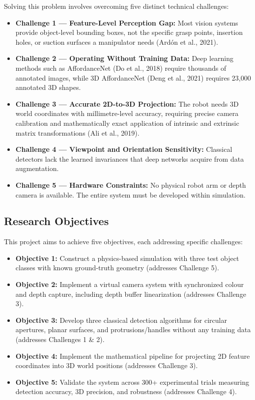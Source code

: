 \documentclass[11pt,a4paper]{article}
\begin{document}
Solving this problem involves overcoming five distinct technical challenges:

\begin{itemize}[leftmargin=1.2cm]
  \item \textbf{Challenge 1 --- Feature-Level Perception Gap:} Most vision systems provide object-level bounding boxes, not the specific grasp points, insertion holes, or suction surfaces a manipulator needs (Ard\'{o}n et al., 2021).
  \item \textbf{Challenge 2 --- Operating Without Training Data:} Deep learning methods such as AffordanceNet (Do et al., 2018) require thousands of annotated images, while 3D AffordanceNet (Deng et al., 2021) requires 23,000 annotated 3D shapes.
  \item \textbf{Challenge 3 --- Accurate 2D-to-3D Projection:} The robot needs 3D world coordinates with millimetre-level accuracy, requiring precise camera calibration and mathematically exact application of intrinsic and extrinsic matrix transformations (Ali et al., 2019).
  \item \textbf{Challenge 4 --- Viewpoint and Orientation Sensitivity:} Classical detectors lack the learned invariances that deep networks acquire from data augmentation.
  \item \textbf{Challenge 5 --- Hardware Constraints:} No physical robot arm or depth camera is available. The entire system must be developed within simulation.
\end{itemize}

\subsection{Research Objectives}

This project aims to achieve five objectives, each addressing specific challenges:

\begin{itemize}[leftmargin=1.2cm]
  \item \textbf{Objective 1:} Construct a physics-based simulation with three test object classes with known ground-truth geometry (addresses Challenge 5).
  \item \textbf{Objective 2:} Implement a virtual camera system with synchronized colour and depth capture, including depth buffer linearization (addresses Challenge 3).
  \item \textbf{Objective 3:} Develop three classical detection algorithms for circular apertures, planar surfaces, and protrusions/handles without any training data (addresses Challenges 1 \& 2).
  \item \textbf{Objective 4:} Implement the mathematical pipeline for projecting 2D feature coordinates into 3D world positions (addresses Challenge 3).
  \item \textbf{Objective 5:} Validate the system across 300+ experimental trials measuring detection accuracy, 3D precision, and robustness (addresses Challenge 4).
\end{itemize}
\end{document}
